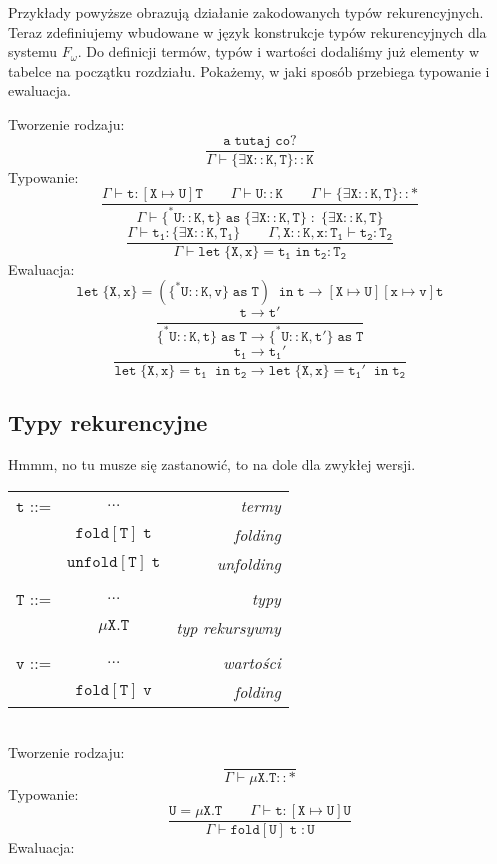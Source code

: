 \documentclass[11pt,leqno]{article}
\begin{document}
\normalsize{
Przykłady powyższe obrazują działanie zakodowanych typów rekurencyjnych. Teraz zdefiniujemy wbudowane w język konstrukcje typów rekurencyjnych dla systemu $F_\omega$. Do definicji termów, typów i wartości dodaliśmy już elementy w tabelce na początku rozdziału. Pokażemy, w jaki sposób przebiega typowanie i ewaluacja. \\
}


Tworzenie rodzaju:
 	\[\mathtt{ \frac{a\;tutaj\;co?}{\Gamma \vdash \{\exists X::K,T\}::K}
		}
	\]
Typowanie:
 	\[\mathtt{ \frac{\Gamma \vdash t:[X \mapsto U]T\hspace{2em}\Gamma \vdash U::K \hspace{2em}\Gamma \vdash \{\exists X::K,T\}::\ast}{\Gamma \vdash \{^*U::K,t\}\;as\;\{\exists X::K,T\} \; : \; \{\exists X::K,T\}}
		}
	\]
 	\[\mathtt{ \frac{\Gamma \vdash t_1:\{\exists X::K,T_1\}\hspace{2em}\Gamma,X::K,x:T_1 \vdash t_2:T_2}{\Gamma \vdash let\;\{X,x\}=t_1\;in\;t_2:T_2}
		}
	\]
Ewaluacja:
 	\[\mathtt{ let\;\{X,x\}=(\{^*U::K,v\}\;as\;T)\;\;in\;t \longrightarrow [X \mapsto U][x \mapsto v]t
		}
	\]
 	\[\mathtt{ \frac{t \longrightarrow t'}{\{^*U::K,t\}\;as\;T \longrightarrow \{^*U::K,t'\}\;as\;T}
		}
	\]
 	\[\mathtt{ \frac{t_1\longrightarrow t_1'}{let\;\{X,x\}=t_1\;\;in\;t_2 \longrightarrow let\;\{X,x\}=t_1'\;\;in\;t_2}
		}
	\]
\subsection{Typy rekurencyjne}

Hmmm, no tu musze się zastanowić, to na dole dla zwykłej wersji. \\
\begin{tabular}{| l c r |}
  \hline
  $\mathtt{t}$ ::= & $\dots$ & \textit{termy}  \\
   & $\mathtt{fold[T]\;t}$ & \textit{folding} \\
   & $\mathtt{unfold[T]\;t}$ & \textit{unfolding}\\
   & & \\
  $\mathtt{T}$ ::= & $\dots$ & \textit{typy}  \\
   & $\mathtt{\mu X.T}$ & \textit{typ rekursywny} \\
   & & \\
  $\mathtt{v}$ ::= & $\dots$ & \textit{wartości}  \\
   & $\mathtt{fold[T]\;v}$ & \textit{folding} \\
  \hline  
\end{tabular} \\
Tworzenie rodzaju:
 	\[\mathtt{\frac{}{\Gamma \vdash \mu X.T::\ast}
		}
	\]
Typowanie:
 	\[\mathtt{ \frac{ U=\mu X.T \hspace{2em} \Gamma \vdash t:[X\mapsto U]U}{\Gamma \vdash fold[U]\;t\; : U}
		}
	\]
Ewaluacja:
 	\[\mathtt{
		}
	\]
\end{document}
